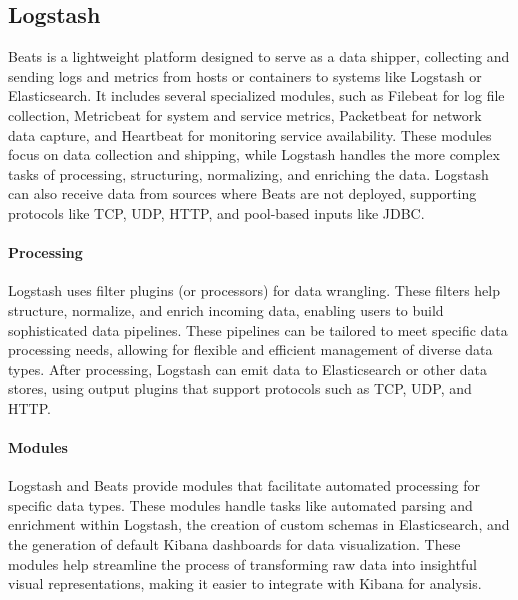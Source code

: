 \subsection{Logstash}
Beats is a lightweight platform designed to serve as a data shipper, collecting and sending logs and metrics from hosts or containers to systems like Logstash or Elasticsearch. 
It includes several specialized modules, such as Filebeat for log file collection, Metricbeat for system and service metrics, Packetbeat for network data capture, and Heartbeat for monitoring service availability. 
These modules focus on data collection and shipping, while Logstash handles the more complex tasks of processing, structuring, normalizing, and enriching the data.
Logstash can also receive data from sources where Beats are not deployed, supporting protocols like TCP, UDP, HTTP, and pool-based inputs like JDBC.

\paragraph*{Processing}
Logstash uses filter plugins (or processors) for data wrangling. 
These filters help structure, normalize, and enrich incoming data, enabling users to build sophisticated data pipelines. 
These pipelines can be tailored to meet specific data processing needs, allowing for flexible and efficient management of diverse data types. 
After processing, Logstash can emit data to Elasticsearch or other data stores, using output plugins that support protocols such as TCP, UDP, and HTTP.

\paragraph*{Modules}
Logstash and Beats provide modules that facilitate automated processing for specific data types. 
These modules handle tasks like automated parsing and enrichment within Logstash, the creation of custom schemas in Elasticsearch, and the generation of default Kibana dashboards for data visualization.
These modules help streamline the process of transforming raw data into insightful visual representations, making it easier to integrate with Kibana for analysis.

